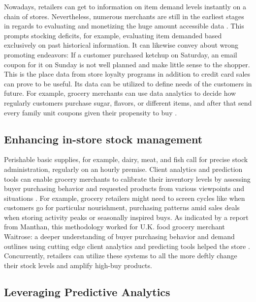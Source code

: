 \documentclass[sigconf]{acmart}
\begin{document}
Nowadays, retailers can get to information on item demand levels instantly on a chain of stores. Nevertheless, numerous merchants are still in the earliest stages in regards to evaluating and monetizing the huge amount accessible data \cite{5}. This prompts stocking deficits, for example, evaluating item demanded based exclusively on past historical information. It can likewise convey about wrong promoting endeavors: If a customer purchased ketchup on Saturday, an email coupon for it on Sunday is not well planned and make little sense to the shopper.  
 	This is the place data from store loyalty programs in addition to credit card sales can prove to be useful. Its data can be utilized to define needs of the customers in future. For example, grocery merchants can use data analytics to decide how regularly customers purchase sugar, flavors, or different items, and after that send every family unit coupons given their propensity to buy \cite{3}.



\subsection{Enhancing in-store stock management }

Perishable basic supplies, for example, dairy, meat, and fish call for precise stock administration, regularly on an hourly premise. Client analytics and prediction tools can enable grocery merchants to calibrate their inventory levels by assessing buyer purchasing behavior and requested products from various viewpoints and situations \cite{3}. 
	For example, grocery retailers might need to screen cycles like when customers go for particular nourishment, purchasing patterns amid sales deals when storing activity peaks or seasonally inspired buys. As indicated by a report from Manthan, this methodology worked for U.K. food grocery merchant Waitrose: a deeper understanding of buyer purchasing behavior and demand outlines using cutting edge client analytics and predicting tools helped the store \cite{4}. Concurrently, retailers can utilize these systems to all the more deftly change their stock levels and amplify high-buy products. 


\subsection{Leveraging Predictive Analytics}
\end{document}
